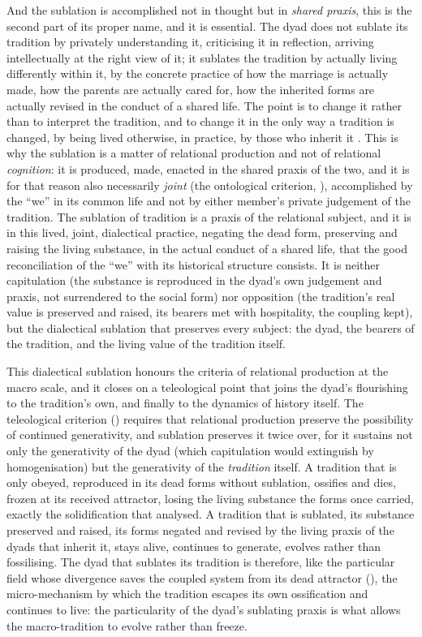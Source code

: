 And the sublation is accomplished not in thought but in \emph{shared praxis}, this is the second part of its proper name, and it is essential. The dyad does not sublate its tradition by privately understanding it, criticising it in reflection, arriving intellectually at the right view of it; it sublates the tradition by actually living differently within it, by the concrete practice of how the marriage is actually made, how the parents are actually cared for, how the inherited forms are actually revised in the conduct of a shared life. The point is to change it rather than to interpret the tradition, and to change it in the only way a tradition is changed, by being lived otherwise, in practice, by those who inherit it \parencite{marx1992}. This is why the sublation is a matter of relational production and not of relational \emph{cognition}: it is produced, made, enacted in the shared praxis of the two, and it is for that reason also necessarily \emph{joint} (the ontological criterion, ), accomplished by the ``we'' in its common life and not by either member's private judgement of the tradition. The sublation of tradition is a praxis of the relational subject, and it is in this lived, joint, dialectical practice, negating the dead form, preserving and raising the living substance, in the actual conduct of a shared life, that the good reconciliation of the ``we'' with its historical structure consists. It is neither capitulation (the substance is reproduced in the dyad's own judgement and praxis, not surrendered to the social form) nor opposition (the tradition's real value is preserved and raised, its bearers met with hospitality, the coupling kept), but the dialectical sublation that preserves every subject: the dyad, the bearers of the tradition, and the living value of the tradition itself.

This dialectical sublation honours the criteria of relational production at the macro scale, and it closes on a teleological point that joins the dyad's flourishing to the tradition's own, and finally to the dynamics of history itself. The teleological criterion () requires that relational production preserve the possibility of continued generativity, and sublation preserves it twice over, for it sustains not only the generativity of the dyad (which capitulation would extinguish by homogenisation) but the generativity of the \emph{tradition} itself. A tradition that is only obeyed, reproduced in its dead forms without sublation, ossifies and dies, frozen at its received attractor, losing the living substance the forms once carried, exactly the solidification that  analysed. A tradition that is sublated, its substance preserved and raised, its forms negated and revised by the living praxis of the dyads that inherit it, stays alive, continues to generate, evolves rather than fossilising. The dyad that sublates its tradition is therefore, like the particular field whose divergence saves the coupled system from its dead attractor (), the micro-mechanism by which the tradition escapes its own ossification and continues to live: the particularity of the dyad's sublating praxis is what allows the macro-tradition to evolve rather than freeze.

